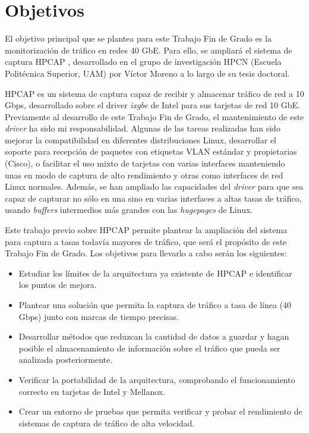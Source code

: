 \documentclass[twoside, 12pt]{epstfg}
\begin{document}
\section{Objetivos}

El objetivo principal que se plantea para este Trabajo Fin de Grado es la monitorización de tráfico en redes 40 GbE. Para ello, se ampliará el sistema de captura HPCAP \cite{victorPhD}, desarrollado en el grupo de investigación HPCN (Escuela Politécnica Superior, UAM) por Víctor Moreno a lo largo de su tesis doctoral.

HPCAP es un sistema de captura capaz de recibir y almacenar tráfico de red a 10 Gbps, desarrollado sobre el \gls{driver} \textit{ixgbe} de Intel para sus tarjetas de red 10 GbE. Previamente al desarrollo de este Trabajo Fin de Grado, el mantenimiento de este \textit{driver} ha sido mi responsabilidad. Algunas de las tareas realizadas han sido mejorar la compatibilidad en diferentes distribuciones Linux, desarrollar el soporte para recepción de paquetes con etiquetas VLAN estándar y propietarias (Cisco), o facilitar el uso mixto de tarjetas con varias interfaces manteniendo unas en modo de captura de alto rendimiento y otras como interfaces de red Linux normales. Además, se han ampliado las capacidades del \textit{driver} para que sea capaz de capturar no sólo en una sino en varias interfaces a altas tasas de tráfico, usando \textit{buffers} intermedios más grandes con las \textit{hugepages} de Linux.

Este trabajo previo sobre HPCAP permite plantear la ampliación del sistema para captura a tasas todavía mayores de tráfico, que será el propósito de este Trabajo Fin de Grado. Los objetivos para llevarlo a cabo serán los siguientes:

\begin{itemize}[itemsep=0pt, topsep = 5pt]
\item Estudiar los límites de la arquitectura ya existente de HPCAP e identificar los puntos de mejora.
\item Plantear una solución que permita la captura de tráfico a tasa de línea (40 Gbps) junto con marcas de tiempo precisas.
\item Desarrollar métodos que reduzcan la cantidad de datos a guardar y hagan posible el almacenamiento de información sobre el tráfico que pueda ser analizada posteriormente.
\item Verificar la portabilidad de la arquitectura, comprobando el funcionamiento correcto en tarjetas de Intel y Mellanox.
\item Crear un entorno de pruebas que permita verificar y probar el rendimiento de sistemas de captura de tráfico de alta velocidad.
\end{itemize}
\end{document}
